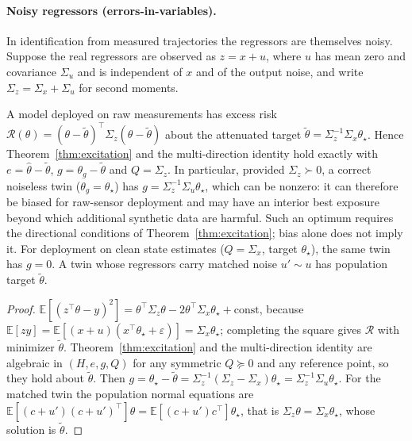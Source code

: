\paragraph{Noisy regressors (errors-in-variables).}
In identification from measured trajectories the regressors are themselves noisy. Suppose the real regressors are observed as $z=x+u$, where $u$ has mean zero and covariance $\Sigma_u$ and is independent of $x$ and of the output noise, and write $\Sigma_z=\Sigma_x+\Sigma_u$ for second moments.
\begin{corollary}\label{cor:eiv}
A model deployed on raw measurements has excess risk $\mathcal R(\theta)=(\theta-\tilde\theta)^\top\Sigma_z(\theta-\tilde\theta)$ about the attenuated target $\tilde\theta=\Sigma_z^{-1}\Sigma_x\theta_\star$. Hence Theorem~\ref{thm:excitation} and the multi-direction identity hold exactly with $e=\widehat\theta-\tilde\theta$, $g=\theta_g-\tilde\theta$ and $Q=\Sigma_z$. In particular, provided $\Sigma_z\succ0$, a correct noiseless twin ($\theta_g=\theta_\star$) has $g=\Sigma_z^{-1}\Sigma_u\theta_\star$, which can be nonzero: it can therefore be biased for raw-sensor deployment and may have an interior best exposure beyond which additional synthetic data are harmful. Such an optimum requires the directional conditions of Theorem~\ref{thm:excitation}; bias alone does not imply it. For deployment on clean state estimates ($Q=\Sigma_x$, target $\theta_\star$), the same twin has $g=0$. A twin whose regressors carry matched noise $u'\sim u$ has population target $\tilde\theta$.
\end{corollary}
\begin{proof}
$\mathbb E[(z^\top\theta-y)^2]=\theta^\top\Sigma_z\theta-2\theta^\top\Sigma_x\theta_\star+\mathrm{const}$, because $\mathbb E[zy]=\mathbb E[(x+u)(x^\top\theta_\star+\varepsilon)]=\Sigma_x\theta_\star$; completing the square gives $\mathcal R$ with minimizer $\tilde\theta$. Theorem~\ref{thm:excitation} and the multi-direction identity are algebraic in $(H,e,g,Q)$ for any symmetric $Q\succeq0$ and any reference point, so they hold about $\tilde\theta$. Then $g=\theta_\star-\tilde\theta=\Sigma_z^{-1}(\Sigma_z-\Sigma_x)\theta_\star=\Sigma_z^{-1}\Sigma_u\theta_\star$. For the matched twin the population normal equations are $\mathbb E[(c+u')(c+u')^\top]\theta=\mathbb E[(c+u')c^\top]\theta_\star$, that is $\Sigma_z\theta=\Sigma_x\theta_\star$, whose solution is $\tilde\theta$.
\end{proof}
